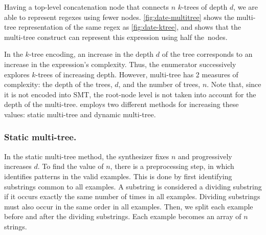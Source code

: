 Having a top-level concatenation node that connects \(n\) \(k\)-trees of depth \(d\), we are able to represent regexes using fewer nodes. \autoref{fig:date-multitree} shows the multi-tree representation of the same regex as \autoref{fig:date-ktree}, and shows that the multi-tree construct can represent this expression using half the~nodes.

In the \(k\)-tree encoding, an increase in the depth \(d\) of the tree corresponds to an increase in the expression's complexity. Thus, the enumerator successively explores \(k\)-trees of increasing depth. However, multi-tree has 2 measures of complexity: the depth of the trees, \(d\), and the number of trees, \(n\). Note that, since it is not encoded into \ac{SMT}, the root-node level is not taken into account for the depth of the multi-tree. \Forest{} employs two different methods for increasing these values: static multi-tree and dynamic multi-tree.

\subsubsection{Static multi-tree.} \label{sec:static-multi-tree} In the static multi-tree method, the synthesizer fixes \(n\) and progressively increases \(d\). To find the value of \(n\), there is a preprocessing step, in which \Forest{} identifies patterns in the valid examples. This is done by first identifying substrings common to all examples. A substring is considered a dividing substring if it occurs exactly the same number of times in all examples. Dividing substrings must also occur in the same order in all examples. Then, we split each example before and after the dividing substrings. Each example becomes an array of \(n\) strings.

